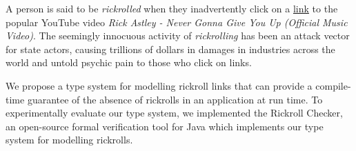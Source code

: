 A person is said to be \textit{rickrolled} when they inadvertently click on a
\href{https://www.youtube.com/watch?v=dQw4w9WgXcQ}{link} to the popular YouTube
video \textit{Rick Astley - Never Gonna Give You Up (Official Music Video)}.
The seemingly innocuous activity of \textit{rickrolling} has been an attack
vector for state actors, causing trillions of dollars in damages in industries
across the world and untold psychic pain to those who click on links.

We propose a type system for modelling rickroll links that can provide a
compile-time guarantee of the absence of rickrolls in an application at run
time.
To experimentally evaluate our type system, we implemented the Rickroll
Checker, an open-source formal verification tool for Java which implements our
type system for modelling rickrolls.

\label{dummy-label-for-etags:abstract}
